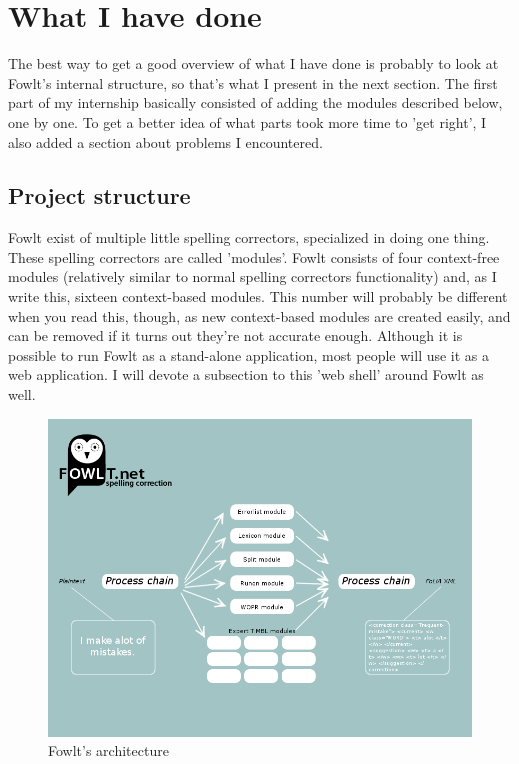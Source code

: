\documentclass[12pt]{article}
\let\stdsection\section
\renewcommand\section{\newpage\stdsection}
\begin{document}
\section{What I have done}
The best way to get a good overview of what I have done is probably to look at Fowlt's internal structure, so that's what I present in the next section. The first part of my internship basically consisted of adding the modules described below, one by one. To get a better idea of what parts took more time to 'get right', I also added a section about problems I encountered.

\subsection{Project structure}
Fowlt exist of multiple little spelling correctors, specialized in doing one thing. These spelling correctors are called 'modules'. Fowlt consists of four context-free modules (relatively similar to normal spelling correctors functionality) and, as I write this, sixteen context-based modules. This number will probably be different when you read this, though, as new context-based modules are created easily, and can be removed if it turns out they're not accurate enough. Although it is possible to run Fowlt as a stand-alone application, most people will use it as a web application. I will devote a subsection to this 'web shell' around Fowlt as well.

\begin{figure}[H]
\centering
\includegraphics[width=1\textwidth]{fowlt_chain.png}
\caption{Fowlt's architecture}
\label{fig:chain}
\end{figure}
\end{document}
